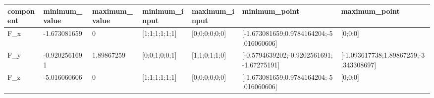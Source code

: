 \begin{tabular}{@{}lllllll@{}}
\toprule
component & minimum\_value & maximum\_value & minimum\_input & maximum\_input & minimum\_point & maximum\_point \\
\midrule
F\_x & -1.673081659 & 0 & [1;1;1;1;1;1] & [0;0;0;0;0;0] & [-1.673081659;0.9784164204;-5.016060606] & [0;0;0] \\
F\_y & -0.9202561691 & 1.89867259 & [0;0;1;0;0;1] & [1;1;0;1;1;0] & [-0.5794639202;-0.9202561691;-1.67275191] & [-1.093617738;1.89867259;-3.343308697] \\
F\_z & -5.016060606 & 0 & [1;1;1;1;1;1] & [0;0;0;0;0;0] & [-1.673081659;0.9784164204;-5.016060606] & [0;0;0] \\
\bottomrule
\end{tabular}
